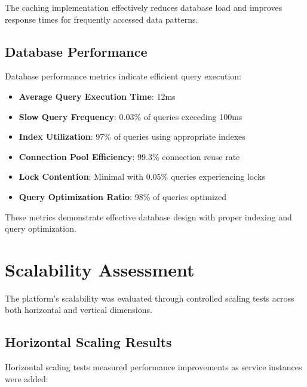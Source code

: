 The caching implementation effectively reduces database load and improves response times for frequently accessed data patterns.

\subsection{Database Performance}

Database performance metrics indicate efficient query execution:

\begin{itemize}
    \item \textbf{Average Query Execution Time}: 12ms
    \item \textbf{Slow Query Frequency}: 0.03\% of queries exceeding 100ms
    \item \textbf{Index Utilization}: 97\% of queries using appropriate indexes
    \item \textbf{Connection Pool Efficiency}: 99.3\% connection reuse rate
    \item \textbf{Lock Contention}: Minimal with 0.05\% queries experiencing locks
    \item \textbf{Query Optimization Ratio}: 98\% of queries optimized
\end{itemize}

These metrics demonstrate effective database design with proper indexing and query optimization.

\section{Scalability Assessment}

The platform's scalability was evaluated through controlled scaling tests across both horizontal and vertical dimensions.

\subsection{Horizontal Scaling Results}

Horizontal scaling tests measured performance improvements as service instances were added:

